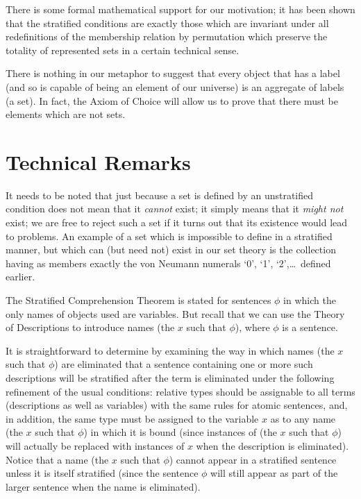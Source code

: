 There is some formal mathematical support for our motivation; it has
been shown that the stratified conditions are exactly
those which are invariant under all redefinitions of the
membership relation by permutation which preserve the
totality of represented sets in a certain technical sense.

There is nothing in our metaphor to suggest that every object that has
a label (and so is capable of being an element of our universe) is an
aggregate of labels (a set).  In fact, the Axiom of Choice will allow us to prove that there must be elements which are not sets.


\section{Technical Remarks}

It needs to be noted that just because a set is defined by an
unstratified condition does not mean that it {\itshape
cannot\/} exist; it simply means that it {\itshape might not\/} exist; we are
free to reject such a set if it turns out that its existence would lead to
problems.  An example of a set which is impossible to define in a stratified
manner, but which can (but need not) exist in our set theory is the collection
having as members exactly the von Neumann numerals
`0', `1', `2',\ldots\ defined earlier.

The Stratified Comprehension Theorem is
stated for sentences $\phi$ in which the only names of objects used are
variables.  But recall that we can use the Theory of Descriptions to introduce
names (the $x$ such that $\phi$), where $\phi$ is a sentence.  

It is straightforward to determine by examining the way in which names
(the $x$ such that $\phi$) are eliminated that a sentence containing
one or more such descriptions will be stratified after the term is
eliminated under the following refinement of the usual conditions:
relative types should be assignable to all terms (descriptions as well
as variables) with the same rules for atomic sentences, and, in
addition, the same type must be assigned to the variable $x$ as to any
name (the $x$ such that $\phi$) in which it is bound (since instances
of (the $x$ such that $\phi$) will actually be replaced with instances
of $x$ when the description is eliminated).  Notice that a name (the
$x$ such that $\phi$) cannot appear in a stratified sentence unless it
is itself stratified (since the sentence $\phi$ will still appear as
part of the larger sentence when the name is eliminated).

